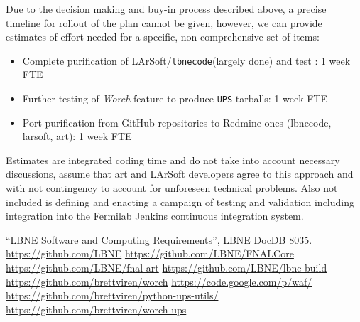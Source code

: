 \documentclass[usletter]{article}
\newcommand{\code}[1]{\texttt{#1}}
\newcommand{\worch}{\textit{Worch}\xspace}
\newcommand{\ups}{\code{UPS}\xspace}
\newcommand{\art}{art\xspace}
\newcommand{\larsoft}{LArSoft\xspace}
\newcommand{\lbnecode}{\code{lbnecode}\xspace}
\begin{document}
Due to the decision making and buy-in process described above, a
precise timeline for rollout of the plan cannot be given, however, we can provide  estimates
of effort needed for a specific, non-comprehensive set of items:
\begin{itemize}
\item Complete purification of \larsoft/\lbnecode (largely done) and test : 1 week FTE
\item Further testing of \worch feature to produce \ups tarballs:  1 week FTE
\item Port purification from GitHub repositories to Redmine ones
  (lbnecode, larsoft, art): 1 week FTE
\end{itemize}

Estimates are integrated coding time and do not take into account
necessary discussions, assume that \art and \larsoft developers agree
to this approach and with not contingency to account for unforeseen
technical problems.  Also not included is defining and enacting a
campaign of testing and validation including integration into the
Fermilab Jenkins continuous integration system.

\begin{thebibliography}{99}
 ``LBNE Software and Computing Requirements'', LBNE DocDB 8035.
 \url{https://github.com/LBNE}
 \url{https://github.com/LBNE/FNALCore}
 \url{https://github.com/LBNE/fnal-art}
 \url{https://github.com/LBNE/lbne-build}
 \url{https://github.com/brettviren/worch}
 \url{https://code.google.com/p/waf/}
 \url{https://github.com/brettviren/python-ups-utils/}
 \url{https://github.com/brettviren/worch-ups}
\end{thebibliography}
\end{document}
